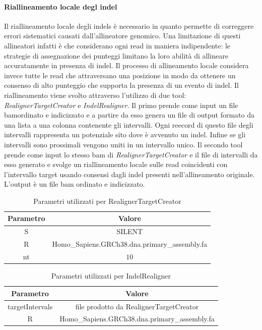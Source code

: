     \paragraph{Riallineamento locale degl indel}
    Il riallineamento locale degli indels \`e necessario in quanto permette di correggere errori sistematici causati dall'allineatore genomico.
    Una limitazione di questi allineatori infatti \`e che considerano ogni read in maniera indipendente: le strategie di assegnazione dei punteggi limitano la loro abilit\`a di allineare accuratamente in presenza di indel.
    Il processo di allineamento locale considera invece tutte le read che attraversano una posizione in modo da ottenere un consenso di alto punteggio che supporta la presenza di un evento di indel.
    Il riallineamento viene svolto attraverso l'utilizzo di due tool: \emph{RealignerTargetCreator} e \emph{IndelRealigner}.
    Il primo prende come input un file bamordinato e indicizzato e a partire da esso genera un file di output formato da una lista a una colonna contenente gli intervalli.
    Ogni reecord di questo file degli intervalli rappresenta un potenziale sito dove \`e avvenuto un indel.
    Infine se gli intervalli sono prossimali vengono uniti in un intervallo unico.
    Il secondo tool prende come input lo stesso bam di \emph{RealignerTargetCreator} e il file di intervalli da esso generato e svolge un riallineamento locale sulle read coincidenti con l'intervallo target usando consensi dagli indel presenti nell'allineamento originale.
    L'output \`e un file bam ordinato e indicizzato.
    \begin{table}[H]
        \centering
        \begin{tabular}{|c|c|}
                \hline
                Parametro & Valore\\
                \hline
                S & SILENT\\
                \hline
                R & Homo\_Sapiens.GRCh38.dna.primary\_assembly.fa\\
                \hline
                nt & $10$\\
                \hline
         \end{tabular}
         \caption{Parametri utilizzati per RealignerTargetCreator}
    \end{table}

    \begin{table}[H]
        \centering
        \begin{tabular}{|c|c|}
                \hline
                Parametro & Valore\\
                \hline
                targetIntervals & file prodotto da RealignerTargetCreator\\
                \hline
                R & Homo\_Sapiens.GRCh38.dna.primary\_assembly.fa\\
                \hline
         \end{tabular}
         \caption{Parametri utilizzati per IndelRealigner}
    \end{table}

